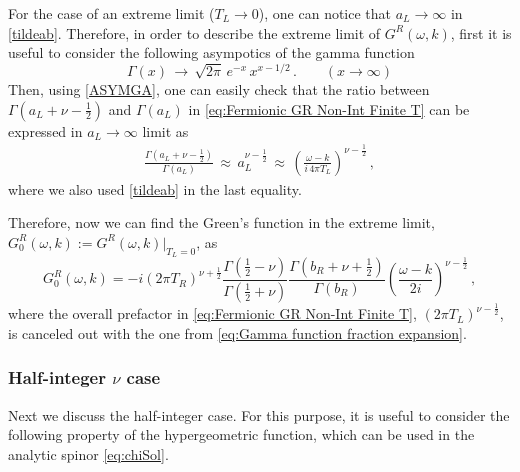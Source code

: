 \documentclass[11pt,a4paper]{article}
\newcommand{\ra}{\rightarrow}
\begin{document}
For the case of an extreme limit ($T_L\rightarrow0$), one can notice that $a_L\rightarrow\infty$ in \eqref{tildeab}.
Therefore, in order to describe the extreme limit of $G^R(\omega,k)$, first it is useful to consider the following asympotics of the gamma function 
\begin{equation}\label{ASYMGA}
    \Gamma(x) \,\ra\, \sqrt{2\pi} \, e^{-x} \, x^{x-1/2}\,. \qquad (x \ra \infty)
\end{equation}
Then, using \eqref{ASYMGA}, one can easily check that the ratio between $\Gamma({a}_L+\nu-\frac{1}{2})$ and $\Gamma({a}_L)$ in \eqref{eq:Fermionic GR Non-Int Finite T} can be expressed in $a_L\rightarrow\infty$ limit as
\begin{equation} \label{eq:Gamma function fraction expansion}
\begin{aligned}
    \frac{\Gamma({a}_L+\nu-\frac{1}{2})}{\Gamma({a}_L)}
     \,\approx\, {a}_L^{\nu-\frac{1}{2}} \,\approx\, \left(\frac{\omega - k}{i\, 4\pi T_L}\right)^{\nu-\frac{1}{2}} \,,
\end{aligned}
\end{equation}
where we also used \eqref{tildeab} in the last equality.

Therefore, now we can find the Green's function in the extreme limit, $G^{R}_{0}(\omega,k):=G^R(\omega,k)|_{T_L=0}$, as
\begin{equation} \label{eq:Fermionic GR Non-Int Zero T}
    G^R_0(\omega,k)  =-i (2\pi T_R)^{\nu+\frac{1}{2}} \frac{\Gamma(\frac{1}{2}-\nu)}{\Gamma(\frac{1}{2}+\nu)} \frac{\Gamma({b}_R+\nu+\frac{1}{2})}{\Gamma({b}_R)}\left( \frac{\omega-k}{2i} \right)^{\nu-\frac{1}{2}}\,,
\end{equation}
where the overall prefactor in \eqref{eq:Fermionic GR Non-Int Finite T}, $(2\pi T_L)^{\nu-\frac{1}{2}}$, is canceled out with the one from \eqref{eq:Gamma function fraction expansion}.




\subsubsection{Half-integer $\nu$ case} \label{subsec:Half-integer GR Fermi}

Next we discuss the half-integer case.
For this purpose, it is useful to consider the following property of the hypergeometric function, which can be used in the analytic spinor \eqref{eq:chiSol}.
\end{document}

